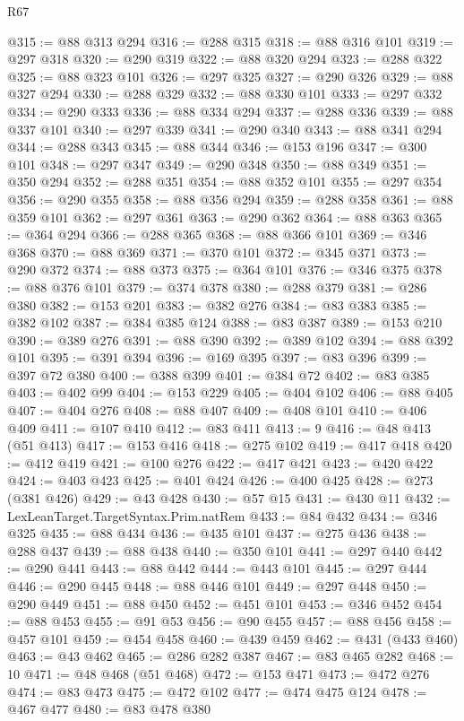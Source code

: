 \begin{lexlean}{R67}
\begin{coremodule}
@315 := @88 @313 @294
@316 := @288 @315
@318 := @88 @316 @101
@319 := @297 @318
@320 := @290 @319
@322 := @88 @320 @294
@323 := @288 @322
@325 := @88 @323 @101
@326 := @297 @325
@327 := @290 @326
@329 := @88 @327 @294
@330 := @288 @329
@332 := @88 @330 @101
@333 := @297 @332
@334 := @290 @333
@336 := @88 @334 @294
@337 := @288 @336
@339 := @88 @337 @101
@340 := @297 @339
@341 := @290 @340
@343 := @88 @341 @294
@344 := @288 @343
@345 := @88 @344
@346 := @153 @196
@347 := @300 @101
@348 := @297 @347
@349 := @290 @348
@350 := @88 @349
@351 := @350 @294
@352 := @288 @351
@354 := @88 @352 @101
@355 := @297 @354
@356 := @290 @355
@358 := @88 @356 @294
@359 := @288 @358
@361 := @88 @359 @101
@362 := @297 @361
@363 := @290 @362
@364 := @88 @363
@365 := @364 @294
@366 := @288 @365
@368 := @88 @366 @101
@369 := @346 @368
@370 := @88 @369
@371 := @370 @101
@372 := @345 @371
@373 := @290 @372
@374 := @88 @373
@375 := @364 @101
@376 := @346 @375
@378 := @88 @376 @101
@379 := @374 @378
@380 := @288 @379
@381 := @286 @380
@382 := @153 @201
@383 := @382 @276
@384 := @83 @383
@385 := @382 @102
@387 := @384 @385 @124
@388 := @83 @387
@389 := @153 @210
@390 := @389 @276
@391 := @88 @390
@392 := @389 @102
@394 := @88 @392 @101
@395 := @391 @394
@396 := @169 @395
@397 := @83 @396
@399 := @397 @72 @380
@400 := @388 @399
@401 := @384 @72
@402 := @83 @385
@403 := @402 @99
@404 := @153 @229
@405 := @404 @102
@406 := @88 @405
@407 := @404 @276
@408 := @88 @407
@409 := @408 @101
@410 := @406 @409
@411 := @107 @410
@412 := @83 @411
@413 := 9
@416 := @48 @413 (@51 @413)
@417 := @153 @416
@418 := @275 @102
@419 := @417 @418
@420 := @412 @419
@421 := @100 @276
@422 := @417 @421
@423 := @420 @422
@424 := @403 @423
@425 := @401 @424
@426 := @400 @425
@428 := @273 (@381 @426)
@429 := @43 @428
@430 := @57 @15
@431 := @430 @11
@432 := LexLeanTarget.TargetSyntax.Prim.natRem
@433 := @84 @432
@434 := @346 @325
@435 := @88 @434
@436 := @435 @101
@437 := @275 @436
@438 := @288 @437
@439 := @88 @438
@440 := @350 @101
@441 := @297 @440
@442 := @290 @441
@443 := @88 @442
@444 := @443 @101
@445 := @297 @444
@446 := @290 @445
@448 := @88 @446 @101
@449 := @297 @448
@450 := @290 @449
@451 := @88 @450
@452 := @451 @101
@453 := @346 @452
@454 := @88 @453
@455 := @91 @53
@456 := @90 @455
@457 := @88 @456
@458 := @457 @101
@459 := @454 @458
@460 := @439 @459
@462 := @431 (@433 @460)
@463 := @43 @462
@465 := @286 @282 @387
@467 := @83 @465 @282
@468 := 10
@471 := @48 @468 (@51 @468)
@472 := @153 @471
@473 := @472 @276
@474 := @83 @473
@475 := @472 @102
@477 := @474 @475 @124
@478 := @467 @477
@480 := @83 @478 @380

\end{coremodule}
\end{lexlean}
